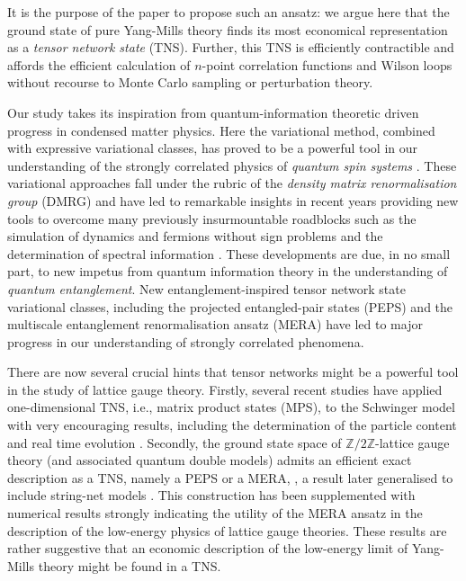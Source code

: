 \documentclass[twocolumn,lengthcheck,superscriptaddress]{revtex4-1}
\theoremstyle{definition}
\theoremstyle{remark}
\begin{document}
It is the purpose of the paper to propose such an ansatz: we argue here that the ground state of pure Yang-Mills theory finds its most economical representation as a \emph{tensor network state} (TNS). Further, this TNS is efficiently contractible and affords the efficient calculation of $n$-point correlation functions and Wilson loops without recourse to Monte Carlo sampling or perturbation theory.

Our study takes its inspiration from quantum-information theoretic driven progress in condensed matter physics. Here the variational method, combined with expressive variational classes, has proved to be a powerful tool in our understanding of the strongly correlated physics of \emph{quantum spin systems} \cite{auerbach:1994a, sachdev:2011a}. These variational approaches fall under the rubric of the \emph{density matrix renormalisation group} (DMRG) \cite{schollwoeck:2005a,schollwock:2011a} and have led to remarkable insights in recent years providing new tools to overcome many previously insurmountable roadblocks such as the simulation of dynamics \cite{vidal:2003a, haegeman:2011b} and fermions \cite{corboz:2009a, corboz:2010a, corboz:2010b, kraus:2010a} without sign problems and the determination of spectral information \cite{haegeman:2012a}. These developments are due, in no small part, to new impetus from quantum information theory in the understanding of \emph{quantum entanglement}. New entanglement-inspired tensor network state variational classes, including the projected entangled-pair states (PEPS) \cite{verstraete:2004a} and the multiscale entanglement renormalisation ansatz (MERA) \cite{vidal:2006a, vidal:2007a} have led to major progress in our understanding of strongly correlated phenomena.

There are now several crucial hints that tensor networks might be a powerful tool in the study of lattice gauge theory. Firstly, several recent studies have applied one-dimensional TNS, i.e., matrix product states (MPS), to the Schwinger model with very encouraging results, including the determination of the particle content and real time evolution \cite{byrnes:2002a,sugihara:2005a,banuls:2013b,banuls:2013a,buyens:2014,buyens:2015dkc,rico:2014,kuhn:2015,buyens_tensor_2015,pichler_real-time_2016,dittrich_decorated_2014,tagliacozzo_tensor_2014,silvi_lattice_2014,zohar:2015,dalmonte_lattice_2016,zohar:2016}. Secondly, the ground state space of $\mathbb{Z}/2\mathbb{Z}$-lattice gauge theory (and associated quantum double models) admits an efficient exact description as a TNS, namely a PEPS or a MERA, \cite{dennis:2002a, aguado:2008a}, a result later generalised to include string-net models \cite{buerschaper:2009a, koenig:2009a}. This construction has been supplemented with numerical results \cite{tagliacozzo:2011a} strongly indicating the utility of the MERA ansatz in the description of the low-energy physics of lattice gauge theories. These results are rather suggestive that an economic description of the low-energy limit of Yang-Mills theory might be found in a TNS.
\end{document}
